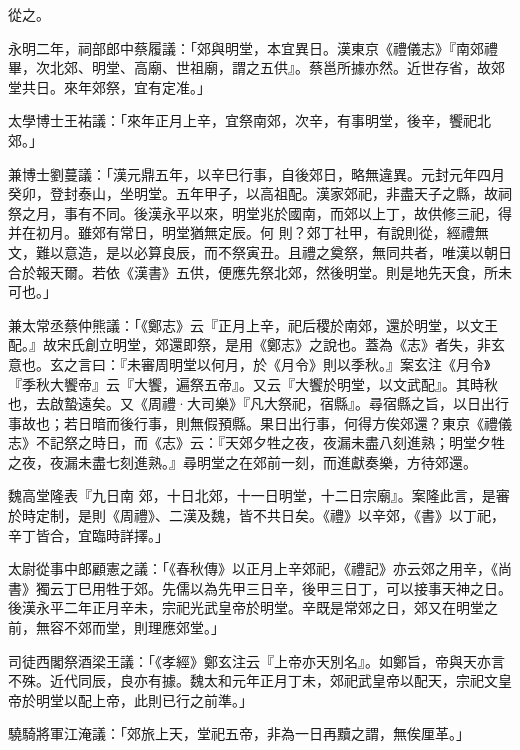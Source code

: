 \begin{pinyinscope}
 從之。



 永明二年，祠部郎中蔡履議：「郊與明堂，本宜異日。漢東京《禮儀志》『南郊禮畢，次北郊、明堂、高廟、世祖廟，謂之五供』。蔡邕所據亦然。近世存省，故郊堂共日。來年郊祭，宜有定准。」



 太學博士王祐議：「來年正月上辛，宜祭南郊，次辛，有事明堂，後辛，饗祀北郊。」



 兼博士劉蔓議：「漢元鼎五年，以辛巳行事，自後郊日，略無違異。元封元年四月癸卯，登封泰山，坐明堂。五年甲子，以高祖配。漢家郊祀，非盡天子之縣，故祠祭之月，事有不同。後漢永平以來，明堂兆於國南，而郊以上丁，故供修三祀，得并在初月。雖郊有常日，明堂猶無定辰。何
 則？郊丁社甲，有說則從，經禮無文，難以意造，是以必算良辰，而不祭寅丑。且禮之奠祭，無同共者，唯漢以朝日合於報天爾。若依《漢書》五供，便應先祭北郊，然後明堂。則是地先天食，所未可也。」



 兼太常丞蔡仲熊議：「《鄭志》云『正月上辛，祀后稷於南郊，還於明堂，以文王配。』故宋氏創立明堂，郊還即祭，是用《鄭志》之說也。蓋為《志》者失，非玄意也。玄之言曰：『未審周明堂以何月，於《月令》則以季秋。』案玄注《月令》『季秋大饗帝』云『大饗，遍祭五帝』。又云『大饗於明堂，以文武配』。其時秋也，去啟蟄遠矣。又《周禮·大司樂》『凡大祭祀，宿縣』。尋宿縣之旨，以日出行事故也；若日暗而後行事，則無假預縣。果日出行事，何得方俟郊還？東京《禮儀志》不記祭之時日，而《志》云：『天郊夕牲之夜，夜漏未盡八刻進熟；明堂夕牲之夜，夜漏未盡七刻進熟。』尋明堂之在郊前一刻，而進獻奏樂，方待郊還。



 魏高堂隆表『九日南
 郊，十日北郊，十一日明堂，十二日宗廟』。案隆此言，是審於時定制，是則《周禮》、二漢及魏，皆不共日矣。《禮》以辛郊，《書》以丁祀，辛丁皆合，宜臨時詳擇。」



 太尉從事中郎顧憲之議：「《春秋傳》以正月上辛郊祀，《禮記》亦云郊之用辛，《尚書》獨云丁巳用牲于郊。先儒以為先甲三日辛，後甲三日丁，可以接事天神之日。後漢永平二年正月辛未，宗祀光武皇帝於明堂。辛既是常郊之日，郊又在明堂之前，無容不郊而堂，則理應郊堂。」



 司徒西閣祭酒梁王議：「《孝經》鄭玄注云『上帝亦天別名』。如鄭旨，帝與天亦言不殊。近代同辰，良亦有據。魏太和元年正月丁未，郊祀武皇帝以配天，宗祀文皇帝於明堂以配上帝，此則已行之前準。」



 驍騎將軍江淹議：「郊旅上天，堂祀五帝，非為一日再黷之謂，無俟厘革。」




\end{pinyinscope}
